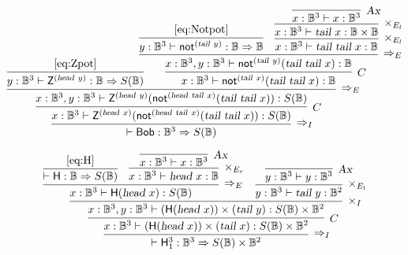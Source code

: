 \documentclass[preprint]{elsarticle}
\newcommand\B{\ensuremath{\mathbb B}}
\newcommand\s[1]{\ensuremath{\mathsf{#1}}}
\newcommand\head{\text{\sl head}}
\newcommand\tail{\text{\sl tail}}
\newcommand\tax{\textsl{Ax}}
\begin{document}
\begin{equation}
  \label{eq:Bob}
  \infer[\Rightarrow_I]
  {\vdash \s{Bob}:\B^3\Rightarrow S(\B)}
  {
    \infer[C]
    {x:\B^3\vdash \s Z^{(\head\ x)}(\s{not}^{(\head\ \tail\ x)}(\tail\ \tail\ x)):S(\B)}
    {
      \infer[\Rightarrow_E]
      {x:\B^3,y:\B^3\vdash \s Z^{(\head\ y)}(\s{not}^{(\head\ \tail\ x)}(\tail\ \tail\ x)):S(\B)}
      {
        \infer
        {y:\B^3\vdash \s Z^{(\head\ y)}:\B\Rightarrow S(\B)}
        {\eqref{eq:Zpot}}
        &
        \hspace{-5mm}\infer[C]
        {x:\B^3\vdash \s{not}^{(\tail\ x)}(\tail\ \tail\ x):\B}
        {
          \infer[\Rightarrow_E]
          {x:\B^3,y:\B^3\vdash \s{not}^{(\tail\ y)}(\tail\ \tail\ x):\B}
          {
            \infer
            {y:\B^3\vdash \s{not}^{(\tail\ y)}:\B\Rightarrow\B}
            {\eqref{eq:Notpot}}
            &
            \infer[\times_{E_l}]
            {x:\B^3\vdash\tail\ \tail\ x:\B}
            {
              \infer[\times_{E_l}]
              {x:\B^3\vdash\tail\ x:\B\times\B}
              {
                \infer[\tax]
                {x:\B^3\vdash x:\B^3}
                {}
              }
            }
          }
        }
      }
    }
  }
\end{equation}

\begin{equation}
  \label{eq:HoneThree}
  \infer[\Rightarrow_I]
  {\vdash \s H_1^3:\B^3\Rightarrow S(\B)\times\B^2}
  {
    \infer[C]
    {x:\B^3\vdash (\s H(\head\ x))\times(\tail\ x):S(\B)\times\B^2}
    {
      \infer[\times_I]
      {x:\B^3,y:\B^3\vdash (\s H(\head\ x))\times(\tail\ y):S(\B)\times\B^2}
      {
        \infer[\Rightarrow_E]
        {x:\B^3\vdash \s H(\head\ x):S(\B)}
        {
          \infer
          {\vdash \s H:\B\Rightarrow S(\B)}
          {\eqref{eq:H}}
          &
          \infer[\times_{E_r}]
          {x:\B^3\vdash\head\ x:\B}
          {
            \infer[\tax]{x:\B^3\vdash x:\B^3}{}
          }
        }
        &
        \infer[\times_{E_l}]
        {y:\B^3\vdash\tail\ y:\B^2}
        {
          \infer[\tax]{y:\B^3\vdash y:\B^3}{}
        }
      }
    }
  }
\end{equation}
\end{document}
